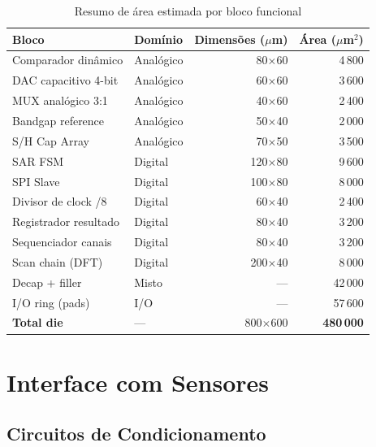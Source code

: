 \documentclass[12pt,a4paper]{article}
\begin{document}
\begin{table}[H]
  \centering
  \caption{Resumo de área estimada por bloco funcional}
  \label{tab:area_blocks}
  \begin{tabular}{llrr}
    \toprule
    \textbf{Bloco} & \textbf{Domínio} &
    \textbf{Dimensões ($\mu$m)} & \textbf{Área ($\mu$m$^2$)} \\
    \midrule
    Comparador dinâmico  & Analógico  & 80$\times$60  &  4\,800 \\
    DAC capacitivo 4-bit & Analógico  & 60$\times$60  &  3\,600 \\
    MUX analógico 3:1    & Analógico  & 40$\times$60  &  2\,400 \\
    Bandgap reference    & Analógico  & 50$\times$40  &  2\,000 \\
    S/H Cap Array        & Analógico  & 70$\times$50  &  3\,500 \\
    SAR FSM              & Digital    & 120$\times$80 &  9\,600 \\
    SPI Slave            & Digital    & 100$\times$80 &  8\,000 \\
    Divisor de clock /8  & Digital    & 60$\times$40  &  2\,400 \\
    Registrador resultado& Digital    & 80$\times$40  &  3\,200 \\
    Sequenciador canais  & Digital    & 80$\times$40  &  3\,200 \\
    Scan chain (DFT)     & Digital    & 200$\times$40 &  8\,000 \\
    Decap + filler       & Misto      & ---    & 42\,000 \\
    I/O ring (pads)      & I/O        & ---    & 57\,600 \\
    \midrule
    \textbf{Total die}   & ---        & 800$\times$600 & \textbf{480\,000} \\
    \bottomrule
  \end{tabular}
\end{table}

\newpage

\section{Interface com Sensores}
\label{sec:sensors}

\subsection{Circuitos de Condicionamento}
\end{document}
